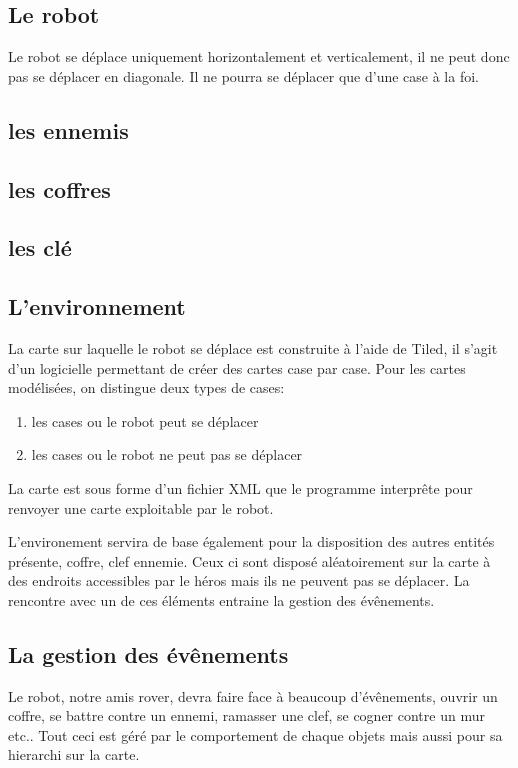\documentclass[a4paper 12pts]{article}
\begin{document}
\subsection{Le robot}
Le robot se déplace uniquement horizontalement et verticalement, il ne peut donc pas se déplacer en diagonale. 
Il ne pourra se déplacer que d'une case à la foi.

\subsection{les ennemis}

\subsection{les coffres}

\subsection{les clé}

\subsection{L'environnement}
La carte sur laquelle le robot se déplace est construite à l'aide de Tiled, il s'agit d'un logicielle permettant de créer des cartes case par case. 
Pour les cartes modélisées, on distingue deux types de cases:

\begin{enumerate}
	\item les cases ou le robot peut se déplacer
	\item les cases ou le robot ne peut pas se déplacer
\end{enumerate}

La carte est sous forme d'un fichier XML que le programme interprête pour renvoyer une carte exploitable par le robot.

L'environement servira de base également pour la disposition des autres entités présente, coffre, clef ennemie.
Ceux ci sont disposé aléatoirement sur la carte à des endroits accessibles par le héros mais ils ne peuvent pas se déplacer.
La rencontre avec un de ces éléments entraine la gestion des évênements.


\subsection{La gestion des évênements}

Le robot, notre amis rover, devra faire face à beaucoup d'évênements, ouvrir un coffre, se battre contre un ennemi, ramasser une clef, se cogner contre un mur etc..
Tout ceci est géré par le comportement de chaque objets mais aussi pour sa hierarchi sur la carte.
\end{document}
